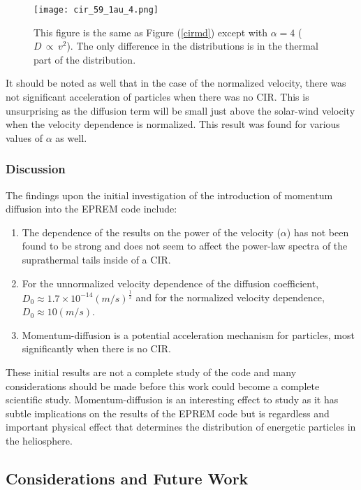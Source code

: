 \documentclass[%
 reprint,
 amsmath,amssymb,
 aps,
]{revtex4-1}
\begin{document}
\begin{figure}[h]
\texttt{[image: cir\_59\_1au\_4.png]}
\caption{This figure is the same as Figure (\ref{cirmd}) except with $\alpha = 4$ ($D \, \propto \,v^2$). The only difference in the distributions is in the thermal part of the distribution. \label{alpha4}}
\end{figure}

It should be noted as well that in the case of the normalized velocity, there was not significant acceleration of particles when there was no CIR. This is unsurprising as the diffusion term will be small just above the solar-wind velocity when the velocity dependence is normalized. This result was found for various values of $\alpha$ as well. 

\subsubsection{Discussion}

The findings upon the initial investigation of the introduction of momentum diffusion into the EPREM code include:

\begin{enumerate}

	\item The dependence of the results on the power of the velocity ($\alpha$) has not been found to be strong and does not seem to affect the power-law spectra of the suprathermal tails inside of a CIR.

	\item For the unnormalized velocity dependence of the diffusion coefficient, $D_0 \approx 1.7\times 10^{-14} (m/s)^{\frac{1}{2}}$ and for the normalized velocity dependence, $D_0 \approx 10 (m/s)$.

	\item Momentum-diffusion is a potential acceleration mechanism for particles, most significantly when there is no CIR.

\end{enumerate}

These initial results are not a complete study of the code and many considerations should be made before this work could become a complete scientific study. Momentum-diffusion is an interesting effect to study as it has subtle implications on the results of the EPREM code but is regardless and important physical effect that determines the distribution of energetic particles in the heliosphere.     

\subsection{Considerations and Future Work}
\end{document}
